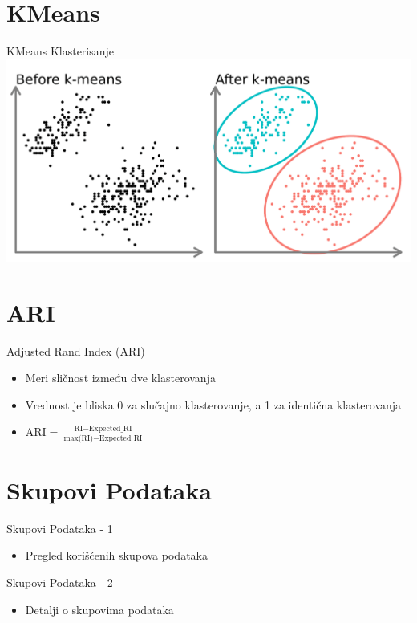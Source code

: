 \documentclass{beamer}
\begin{document}
\section{KMeans}
\begin{frame}{KMeans Klasterisanje}
    \includegraphics[width=\textwidth]{./png/kmeans.png}
\end{frame}

\section{ARI}
\begin{frame}{Adjusted Rand Index (ARI)}
    \begin{itemize}
        \item Meri sličnost između dve klasterovanja
        \item Vrednost je bliska 0 za slučajno klasterovanje, a 1 za identična klasterovanja
        \item $ \text{ARI} = \frac{\text{RI} - \text{Expected\_RI}}{\text{max(RI)} - \text{Expected\_RI}} $
    \end{itemize}
\end{frame}

\section{Skupovi Podataka}
\begin{frame}{Skupovi Podataka - 1}
    \begin{itemize}
        \item Pregled korišćenih skupova podataka
    \end{itemize}
\end{frame}

\begin{frame}{Skupovi Podataka - 2}
    \begin{itemize}
        \item Detalji o skupovima podataka
    \end{itemize}
\end{frame}
\end{document}
